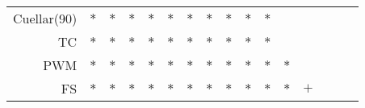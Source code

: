 \documentclass[landscape, 6pt]{report}
\begin{document}
\begin{table}[h!]
\begin{center}
\begin{tabular}{ rccccccccccccccc }
    Cuellar(90) & $*$ & $*$ & $*$ & $*$ & $*$ & $*$ & $*$ & $*$ & $*$ & $*$ &     &     &     &     &     \\
    TC & $*$ & $*$ & $*$ & $*$ & $*$ & $*$ & $*$ & $*$ & $*$ & $*$ &     &     &     &     &     \\
    PWM & $*$ & $*$ & $*$ & $*$ & $*$ & $*$ & $*$ & $*$ & $*$ & $*$ & $*$ &     &     &     &     \\
    FS & $*$ & $*$ & $*$ & $*$ & $*$ & $*$ & $*$ & $*$ & $*$ & $*$ & $*$ & $+$ &     &     &     \\
    \hline
  \end{tabular}
\end{center}
\vspace{0.0cm}
\end{table}
\end{document}

